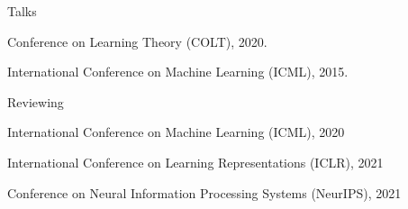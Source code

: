 \documentclass{article}
\begin{document}
\begin{large}
\noindent Talks
\end{large}


\vspace{2mm}
Conference on Learning Theory (COLT), 2020.

\vspace{2mm}
International Conference on Machine Learning (ICML), 2015.



\vspace{2mm}

\begin{large}
\noindent Reviewing
\end{large}


\vspace{2mm}
International Conference on Machine Learning (ICML), 2020

\vspace{2mm}
International Conference on Learning Representations (ICLR), 2021

\vspace{2mm}
Conference on Neural Information Processing Systems (NeurIPS), 2021







\end{document}

